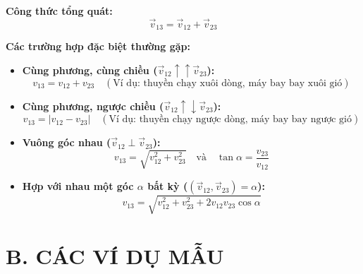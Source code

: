 \textbf{Công thức tổng quát:}
\begin{equation*}
    \vec{v}_{13} = \vec{v}_{12} + \vec{v}_{23}
\end{equation*}

\textbf{Các trường hợp đặc biệt thường gặp:}
\begin{itemize}
    \item \textbf{Cùng phương, cùng chiều ($\vec{v}_{12} \uparrow\uparrow \vec{v}_{23}$):}
    \begin{equation*}
        v_{13} = v_{12} + v_{23} \quad (\text{Ví dụ: thuyền chạy xuôi dòng, máy bay bay xuôi gió})
    \end{equation*}
    \item \textbf{Cùng phương, ngược chiều ($\vec{v}_{12} \uparrow\downarrow \vec{v}_{23}$):}
    \begin{equation*}
        v_{13} = |v_{12} - v_{23}| \quad (\text{Ví dụ: thuyền chạy ngược dòng, máy bay bay ngược gió})
    \end{equation*}
    \item \textbf{Vuông góc nhau ($\vec{v}_{12} \perp \vec{v}_{23}$):}
    \begin{equation*}
        v_{13} = \sqrt{v_{12}^2 + v_{23}^2} \quad \text{và} \quad \tan\alpha = \frac{v_{23}}{v_{12}}
    \end{equation*}
    \item \textbf{Hợp với nhau một góc $\alpha$ bất kỳ ($(\vec{v}_{12}, \vec{v}_{23}) = \alpha$):}
    \begin{equation*}
        v_{13} = \sqrt{v_{12}^2 + v_{23}^2 + 2v_{12}v_{23}\cos\alpha}
    \end{equation*}
\end{itemize}

\section*{B. CÁC VÍ DỤ MẪU}

